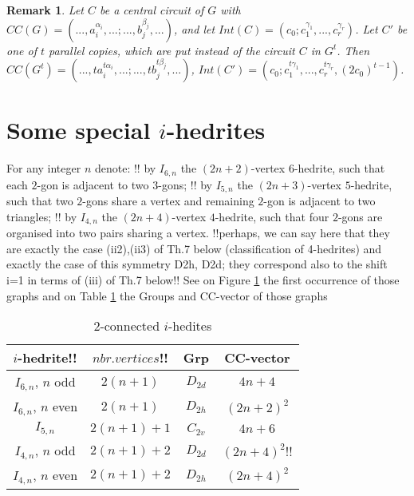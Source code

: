 \documentclass[12pt]{article}
\newtheorem{remark}{Remark}
\begin{document}
\begin{remark}

Let $C$ be a central circuit of $G$ with $CC(G)=(...,a_i^{\alpha_i},...;...,b_j^{\beta_j},...)$,  and let 
$Int(C)=(c_0;c_1^{\gamma_1},...,c_r^{\gamma_r})$. Let $C'$ be one of 
$t$ parallel copies, which are put instead of the circuit $C$ in $G^t$.
Then $CC(G^t)=(...,ta_i^{t\alpha_i},...;...,tb_j^{t\beta_j},...)$,
$Int(C')=(c_0;c_1^{t\gamma_1},...,c_r^{t\gamma_r}, (2c_0)^{t-1})$.
\end{remark}


\section{Some special $i$-hedrites}
For any integer $n$ denote:
!!
by $I_{6,n}$  the $(2n+2)$-vertex
$6$-hedrite, such that each $2$-gon is adjacent to two $3$-gons; 
!!
by $I_{5,n}$ the $(2n+3)$-vertex $5$-hedrite, such that 
two $2$-gons share a vertex and remaining $2$-gon is adjacent
to two triangles;
!!
by $I_{4,n}$ the $(2n+4)$-vertex $4$-hedrite, such that 
four $2$-gons are organised into two pairs sharing a vertex. 
!!perhaps, we can say here that they are exactly the case (ii2),(ii3) of
Th.7 below (classification of 4-hedrites) and exactly the case of this
symmetry D2h, D2d; they correspond also to the shift i=1 in terms of (iii)
of Th.7 below!!
See on Figure \ref{fig:FamilyIin} the first occurrence of those graphs and on Table \ref{FundamentalInfo} the Groups and CC-vector of those graphs

\begin{figure}
\centering
\epsfxsize=100mm
\label{fig:FamilyIin}
\end{figure}

\begin{table}
\begin{center}
\begin{tabular}{||c|c|c|c||}
\hline
$i$-hedrite!!               &$nbr. vertices$!!       &Grp
&CC-vector\\\hline
$I_{6,n}$, $n$ odd  &$2(n+1)$    &$D_{2d}$   &$4n+4$\\
$I_{6,n}$, $n$ even &$2(n+1)$    &$D_{2h}$   &$(2n+2)^2$\\
$I_{5,n}$           &$2(n+1)+1$  &$C_{2v}$   &$4n+6$\\
$I_{4,n}$, $n$ odd  &$2(n+1)+2$  &$D_{2d}$   &$(2n+4)^2$!!\\
$I_{4,n}$, $n$ even &$2(n+1)+2$  &$D_{2h}$   &$(2n+4)^2$\\\hline
\end{tabular}
\end{center}
\caption{$2$-connected $i$-hedites}
\label{FundamentalInfo}
\end{table}
\end{document}
